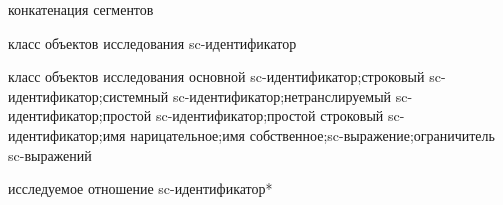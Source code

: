 \begin{SCn}
\scnsectionheader{\currentname}
\begin{scnsubstruct}
\begin{scnreltovector}{конкатенация сегментов}

\end{scnreltovector}
\begin{scnhaselementrole}{класс объектов исследования}
sc-идентификатор\end{scnhaselementrole}
\begin{scnhaselementrolelist}{класс объектов исследования}
основной sc-идентификатор;строковый sc-идентификатор;системный sc-идентификатор;нетранслируемый sc-идентификатор;простой sc-идентификатор;простой строковый sc-идентификатор;имя нарицательное;имя собственное;sc-выражение;ограничитель sc-выражений

\end{scnhaselementrolelist}
\begin{scnhaselementrolelist}{исследуемое отношение}
sc-идентификатор*


\end{scnhaselementrolelist}
\end{scnsubstruct}
\end{SCn}
